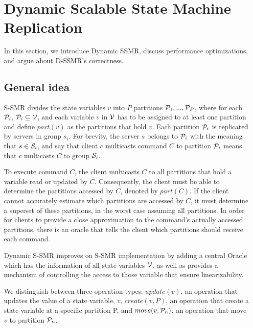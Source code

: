 \section{Dynamic Scalable State Machine Replication}

In this section, we introduce Dynamic SSMR, discuss performance optimizations, and argue about D-SSMR's correctness.

\subsection{General idea}
\label{sec:generalidea}

S-SMR divides the state variables $v$ into $P$ partitions $\mathcal{P}_1, ..., \mathcal{P}_P$, where for each $\mathcal{P}_i$, $\mathcal{P}_i \subseteq \mathcal{V}$, and each variable $v$ in $\mathcal{V}$ has to be assigned to at least one partition and define $part(v)$ as the partitions that hold $v$. Each partition $\mathcal{P}_i$ is replicated by servers in group $s_i$. For brevity, the server $s$ belongs to $\mathcal{P}_i$ with the meaning that $s \in \mathcal{S}_i$, and say that client $c$ multicasts command $C$ to partition $\mathcal{P}_i$ means that $c$ multicasts $C$ to group $\mathcal{S}_i$.

To execute command $C$, the client multicasts $C$ to all partitions that hold a variable read or updated by $C$.
Consequently, the client must be able to determine the partitions accessed by $C$, denoted by $part(C)$. If the client cannot accurately estimate which partitions are accessed by $C$, it must determine a superset of these partitions, in the worst case assuming all partitions.
In order for clients to provide a close approximation to the command's actually accessed partitions, there is an oracle that tells the client which partitions should receive each command.

Dynamic S-SMR improves on S-SMR implementation by adding a central Oracle which has the information of all state variables $\mathcal{V}$, as well as provides a mechanism of controlling the access to those variable that ensure linearizability. 

We distinguish between three operation types: $update(v)$, an operation that updates the value of a state variable, $v$, $create(v, P)$, an operation that create a state variable at a specific partition P, and $move(v, \mathcal{P}_n)$, an operation that move $v$ to partition $\mathcal{P}_n$.

